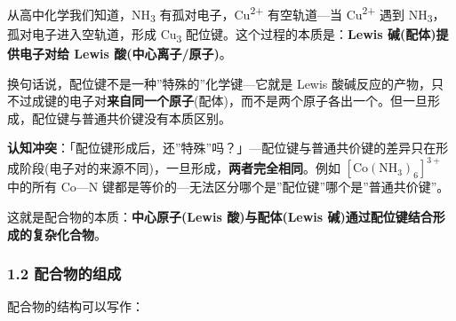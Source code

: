 从高中化学我们知道，NH\textsubscript{3} 有孤对电子，Cu\textsuperscript{2+} 有空轨道---当 Cu\textsuperscript{2+} 遇到 NH\textsubscript{3}，孤对电子进入空轨道，形成 Cu\textsubscript{3} 配位键。这个过程的本质是：\textbf{Lewis 碱(配体)提供电子对给 Lewis 酸(中心离子/原子)}。

换句话说，配位键不是一种''特殊的''化学键---它就是 Lewis 酸碱反应的产物，只不过成键的电子对\textbf{来自同一个原子}(配体)，而不是两个原子各出一个。但一旦形成，配位键与普通共价键没有本质区别。

\textbf{认知冲突}：「配位键形成后，还''特殊''吗？」---配位键与普通共价键的差异只在形成阶段(电子对的来源不同)，一旦形成，\textbf{两者完全相同}。例如 \([\mathrm{Co(NH_3)_6}]^{3+}\) 中的所有 Co---N 键都是等价的---无法区分哪个是''配位键''哪个是''普通共价键''。

这就是配合物的本质：\textbf{中心原子(Lewis 酸)与配体(Lewis 碱)通过配位键结合形成的复杂化合物}。

\subsubsection{1.2 配合物的组成}\label{ux914dux5408ux7269ux7684ux7ec4ux6210}

配合物的结构可以写作：

\begin{Shaded}
\begin{Highlighting}[]
\end{Highlighting}
\end{Shaded}

